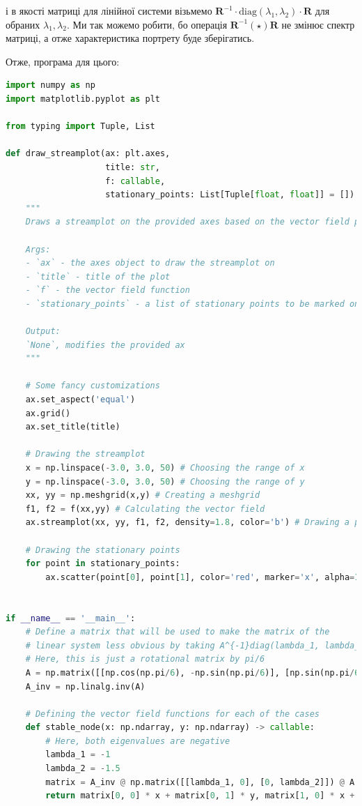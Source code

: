 \documentclass[oneside,solution]{tmpl}
\begin{document}
і в якості матриці для лінійної системи візьмемо $\boldsymbol{R}^{-1}\cdot\text{diag}(\lambda_1,\lambda_2)\cdot\boldsymbol{R}$ для обраних $\lambda_1,\lambda_2$. Ми так можемо робити, бо операція $\boldsymbol{R}^{-1}(\star) \boldsymbol{R}$ не змінює спектр матриці, а отже характеристика портрету буде зберігатись. 

Отже, програма для цього:
\begin{lstlisting}[language=Python]
import numpy as np
import matplotlib.pyplot as plt

from typing import Tuple, List

def draw_streamplot(ax: plt.axes, 
                    title: str,
                    f: callable, 
                    stationary_points: List[Tuple[float, float]] = []) -> None:
    """
    Draws a streamplot on the provided axes based on the vector field provided.
    
    Args:
    - `ax` - the axes object to draw the streamplot on
    - `title` - title of the plot
    - `f` - the vector field function
    - `stationary_points` - a list of stationary points to be marked on the plot. Empty by default.
    
    Output:
    `None`, modifies the provided ax
    """
    
    # Some fancy customizations
    ax.set_aspect('equal')
    ax.grid()
    ax.set_title(title)
    
    # Drawing the streamplot
    x = np.linspace(-3.0, 3.0, 50) # Choosing the range of x 
    y = np.linspace(-3.0, 3.0, 50) # Choosing the range of y
    xx, yy = np.meshgrid(x,y) # Creating a meshgrid
    f1, f2 = f(xx,yy) # Calculating the vector field
    ax.streamplot(xx, yy, f1, f2, density=1.8, color='b') # Drawing a phase portrait
    
    # Drawing the stationary points
    for point in stationary_points:
        ax.scatter(point[0], point[1], color='red', marker='x', alpha=1.0, s=100, linewidths=3.0, zorder=10)
    

if __name__ == '__main__':
    # Define a matrix that will be used to make the matrix of the
    # linear system less obvious by taking A^{-1}diag(lambda_1, lambda_2)A
    # Here, this is just a rotational matrix by pi/6
    A = np.matrix([[np.cos(np.pi/6), -np.sin(np.pi/6)], [np.sin(np.pi/6), np.cos(np.pi/6)]]) 
    A_inv = np.linalg.inv(A)
    
    # Defining the vector field functions for each of the cases
    def stable_node(x: np.ndarray, y: np.ndarray) -> callable:
        # Here, both eigenvalues are negative
        lambda_1 = -1
        lambda_2 = -1.5
        matrix = A_inv @ np.matrix([[lambda_1, 0], [0, lambda_2]]) @ A
        return matrix[0, 0] * x + matrix[0, 1] * y, matrix[1, 0] * x + matrix[1, 1] * y
    

\end{lstlisting}
\end{document}

